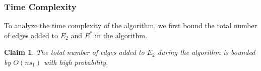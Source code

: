 \documentclass[11pt]{article}
\makeatletter
\newtheorem{claim}[theorem]{Claim}
\theoremstyle{definition}
\theoremstyle{remark}
\newcommand{\ytodo}[1]{\todo[color=blue!20]{Y: #1}}
\newcommand{\sebastian}[1]{\todo[color=green!20]{S: #1}}
\renewcommand{\paragraph}{%
  \@startsection{paragraph}{4}%
  {\z@}{1.4ex \@plus 1ex \@minus .2ex}{-1em}%
  {\normalfont\normalsize\bfseries}%
}
\makeatother
\begin{document}
\begin{titlepage}



\subsubsection{Time Complexity} \label{sec:warmup_add_time}

To analyze the time complexity of the algorithm, we first bound the total number of edges added to $E_2$ and $E^*$ in the algorithm. 

\begin{claim} \label{claim_E2}
The total number of edges added to $E_2$ during the algorithm is bounded by $O(ns_1)$ with high probability.%
\end{claim}


\end{titlepage}
\end{document}
